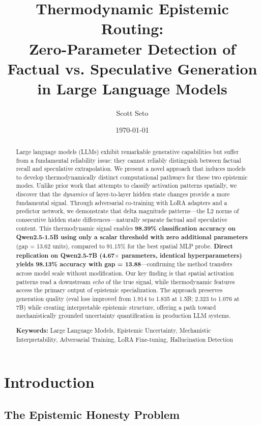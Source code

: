 \documentclass[11pt,a4paper]{article}
\title{\textbf{Thermodynamic Epistemic Routing: \\
Zero-Parameter Detection of Factual vs. Speculative Generation in Large Language Models}}
\author{Scott Seto}
\affil{Independent Researcher \\ \texttt{https://github.com/ameritusweb/thermodynamic-epistemic-routing}}
\date{\today}
\begin{document}
\maketitle

\begin{abstract}
Large language models (LLMs) exhibit remarkable generative capabilities but suffer from a fundamental reliability issue: they cannot reliably distinguish between factual recall and speculative extrapolation. We present a novel approach that induces models to develop thermodynamically distinct computational pathways for these two epistemic modes. Unlike prior work that attempts to classify activation patterns spatially, we discover that the \emph{dynamics} of layer-to-layer hidden state changes provide a more fundamental signal. Through adversarial co-training with LoRA adapters and a predictor network, we demonstrate that delta magnitude patterns---the L2 norms of consecutive hidden state differences---naturally separate factual and speculative content. This thermodynamic signal enables \textbf{98.39\% classification accuracy on Qwen2.5-1.5B using only a scalar threshold with zero additional parameters} (gap = 13.62 units), compared to 91.15\% for the best spatial MLP probe. \textbf{Direct replication on Qwen2.5-7B (4.67$\times$ parameters, identical hyperparameters) yields 98.13\% accuracy with gap = 13.88}---confirming the method transfers across model scale without modification. Our key finding is that spatial activation patterns read a downstream \emph{echo} of the true signal, while thermodynamic features access the primary output of epistemic specialization. The approach preserves generation quality (eval loss improved from 1.914 to 1.835 at 1.5B; 2.323 to 1.076 at 7B) while creating interpretable epistemic structure, offering a path toward mechanistically grounded uncertainty quantification in production LLM systems.

\textbf{Keywords:} Large Language Models, Epistemic Uncertainty, Mechanistic Interpretability, Adversarial Training, LoRA Fine-tuning, Hallucination Detection
\end{abstract}

\section{Introduction}

\subsection{The Epistemic Honesty Problem}
\end{document}
